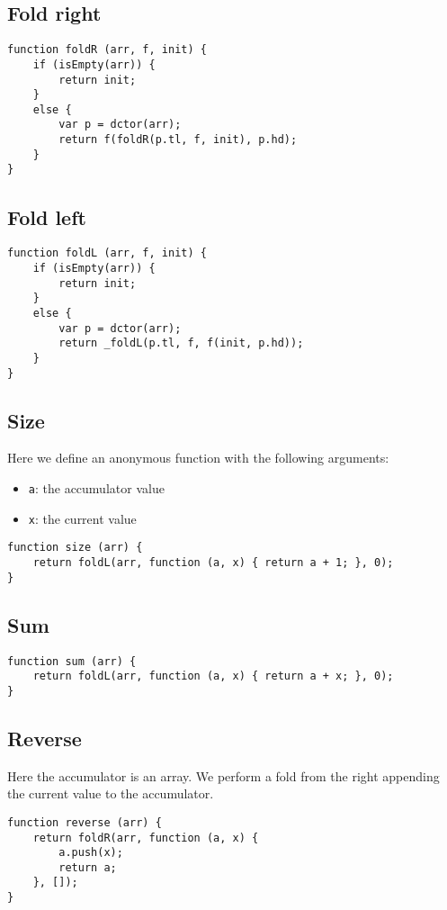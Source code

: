 \documentclass[12pt]{article}
\begin{document}
\subsection*{Fold right}
\medskip
\begin{lstlisting}
function foldR (arr, f, init) {
	if (isEmpty(arr)) {
		return init;
	}
	else {
		var p = dctor(arr);
		return f(foldR(p.tl, f, init), p.hd);
	}
}
\end{lstlisting}

\subsection*{Fold left}
\medskip
\begin{lstlisting}
function foldL (arr, f, init) {
	if (isEmpty(arr)) {
		return init;
	}
	else {
		var p = dctor(arr);
		return _foldL(p.tl, f, f(init, p.hd));
	}
}
\end{lstlisting}

\subsection*{Size}
Here we define an anonymous function with the following arguments:
\begin{itemize}
	\item \verb|a|: the accumulator value
	\item \verb|x|: the current value
\end{itemize}

\medskip
\begin{lstlisting}
function size (arr) {
	return foldL(arr, function (a, x) { return a + 1; }, 0);	
}
\end{lstlisting}

\subsection*{Sum}
\medskip
\begin{lstlisting}
function sum (arr) {
	return foldL(arr, function (a, x) { return a + x; }, 0);	
}
\end{lstlisting}

\subsection*{Reverse}
Here the accumulator is an array. We perform a fold from the right appending the current value
to the accumulator.

\medskip
\begin{lstlisting}
function reverse (arr) {
	return foldR(arr, function (a, x) {
		a.push(x);
		return a;
	}, []);
}
\end{lstlisting}
\end{document}
